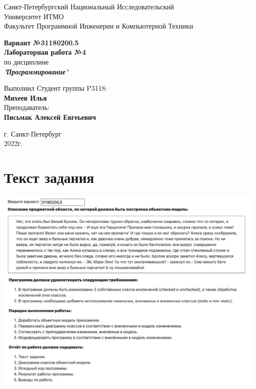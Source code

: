 \documentclass[12pt,onecolumn]{article}
\begin{document}
\begin{center}
    Санкт-Петербургский Национальный Исследовательский\\ 
    Университет ИТМО\\
    Факультет Программной Инженерии и Компьютерной Техники\\
\end{center}
\vspace{1cm}


\begin{center}
    \large \textbf{Вариант №31180200.5}\\
    \textbf{Лабораторная работа №4}\\
    по дисциплине\\
    \textbf{\textit{'Программирование'}}
\end{center}

\vspace{3cm}
\begin{flushright}
  Выполнил Студент  группы P3118: \\
  \textbf{Михеев Илья}\\
  Преподаватель: \\
  \textbf{Письмак Алексей Евгеьевич}\\
\end{flushright}

\vspace{14cm}
\begin{center}
    г. Санкт-Петербург\\
    2022г.
\end{center}

\newpage

\tableofcontents

\vspace{1cm}

\section{Текст задания}
\includegraphics[width=\columnwidth]{imgs/lab4_task.png}
\end{document}
